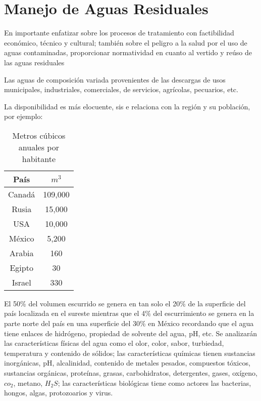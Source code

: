 \chapter{Manejo de Aguas Residuales}
En importante enfatizar sobre los procesos de tratamiento con factibilidad económico, técnico y cultural; también sobre el peligro a la salud por el uso de aguas contaminadas, proporcionar normatividad en cuanto al vertido y reúso de las aguas residuales

\begin{definition}
    Las aguas de composición variada provenientes de las descargas de usos municipales, industriales, comerciales, de servicios, agrícolas, pecuarios, etc.
\end{definition}
La disponibilidad es más elocuente, sis e relaciona con la región y su población, por ejemplo:
\begin{table}[h!]
    \centering
    \begin{tabular}{@{}cc@{}}
    \toprule
    País    & $m^3$   \\ \midrule
    Canadá  & 109,000 \\
    Rusia & 15,000  \\
    USA     & 10,000  \\
    México  & 5,200   \\
    Arabia  & 160     \\
    Egipto  & 30      \\
    Israel  & 330     \\ \bottomrule
    \end{tabular}
    \caption{Metros cúbicos anuales por habitante}
    \label{mar1}
\end{table}
El 50\% del volumen escurrido se genera en tan solo el 20\% de la superficie del país localizada en el sureste mientras que el 4\% del escurrimiento se genera en la parte norte del país en una superficie del 30\% en México
recordando que el agua tiene enlaces de hidrógeno, propiedad de solvente del agua, pH, etc. Se analizarán las características físicas del agua como el olor, color, sabor, turbiedad, temperatura y contenido de sólidos; las características químicas tienen sustancias inorgánicas, pH, alcalinidad, contenido de metales pesados, compuestos tóxicos, sustancias orgánicas, proteínas, grasas, carbohidratos, detergentes, gases, oxígeno, $co_2$, metano, $H_2S$; las características biológicas tiene como actores las bacterias, hongos, algas, protozoarios y virus.

